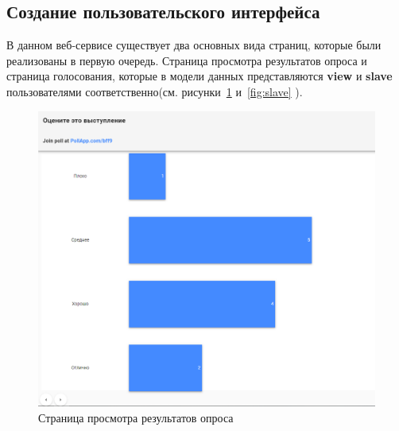 \subsection{Создание пользовательского интерфейса}
В данном веб-сервисе существует два основных вида страниц, которые были реализованы в первую очередь. Страница просмотра результатов опроса и страница голосования, которые в модели данных представляются \textbf{view} и \textbf{slave} пользователями соответственно(см. рисунки~\ref{fig:view} и~\ref{fig:slave} ).
 \begin{figure}[H]
	\centering
	\includegraphics[scale=0.5]{img/view.PNG}
	\caption{\label{fig:view} Страница просмотра результатов опроса}
\end{figure}


